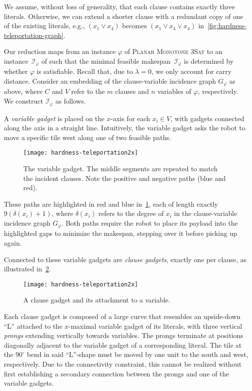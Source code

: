 We assume, without loss of generality, that each clause contains exactly three literals.
Otherwise, we can extend a shorter clause with a redundant copy of one of the existing literals, e.g., $(x_1\lor x_4)$ becomes $(x_1\lor x_4\lor x_4)$ in~\cref{fig:hardness-teleportation-graph}.

Our reduction maps from an instance $\varphi$ of \textsc{Planar Monotone 3Sat} to an instance~$\mathcal{I}_\varphi$ of \probName such that the minimal feasible makespan~$\mathcal{I}_\varphi$ is determined by whether $\varphi$ is satisfiable.
Recall that, due to $\lambda=0$, we only account for carry distance.
Consider an embedding of the clause-variable incidence graph  $G_\varphi$ as above, where $C$ and $V$ refer to the $m$ clauses and $n$ variables of $\varphi$, respectively.
We construct $\mathcal{I}_\varphi$ as follows.

A \emph{variable gadget} is placed on the $x$-axis for each $x_i\in V$, with gadgets connected along the axis in a straight line.
Intuitively, the variable gadget asks the robot to move a specific tile west along one of two feasible paths.
\begin{figure}[htb]
	\centering%
	\texttt{[image: hardness-teleportation2x]}%
	\caption{The variable gadget. The middle segments are repeated to match the incident clauses. Note the positive and negative paths (blue and red).}%
	\label{fig:hardness-teleportation-variable}%
\end{figure}
These paths are highlighted in red and blue in~\cref{fig:hardness-teleportation-variable}, each of length exactly $9(\delta(x_i)+1)$, where $\delta(x_i)$ refers to the degree of $x_i$ in the clause-variable incidence graph $G_\varphi$.
Both paths require the robot to place its payload into the highlighted gaps to minimize the makespan, stepping over it before picking up again.

Connected to these variable gadgets are \emph{clause gadgets}, exactly one per clause, as illustrated in~\cref{fig:hardness-teleportation-clause}.
\begin{figure}[h!tb]%
	\centering%
	\texttt{[image: hardness-teleportation2x]}%
	\caption{A clause gadget and its attachment to a variable.}%
	\label{fig:hardness-teleportation-clause}%
\end{figure}%
Each clause gadget is composed of a large curve that resembles an upside-down ``L'' attached to the $x$-maximal variable gadget of its literals, with three vertical \emph{prongs} extending vertically towards variables.
The prongs terminate at positions diagonally adjacent to the variable gadget of a corresponding literal.
The tile at the $90^\circ$ bend in said ``L''-shape must be moved by one unit to the south and west, respectively.
Due to the connectivity constraint, this cannot be realized without first establishing a secondary connection between the prongs and one of the variable gadgets.

